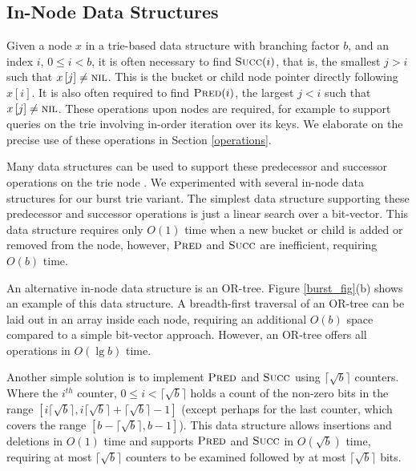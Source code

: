 \documentclass[]{acmtrans2m}
\begin{document}
\subsection{In-Node Data Structures}
\label{in_node_structs}

Given a node $x$ in a trie-based data structure with branching factor $b$, and an index $i$, 
$0 \leq i < b$, it is often necessary to find $\mbox{\textsc{Succ}}(i)$, that is, the smallest $j > i$ such that 
$x\left[j\right] \neq \mbox{\textsc{nil}}$. This is the bucket or child node pointer directly
following $x\left[i\right]$. It is also often required to find $\mbox{\textsc{Pred}}(i)$, 
the largest $j < i$ such that $x\left[j\right] \neq \mbox{\textsc{nil}}$. 
These operations upon nodes are required, for example to support queries on the trie involving
in-order iteration over its keys. We elaborate on the precise use of these operations in Section \ref{operations}.

Many data structures can be used to support these predecessor and successor operations on the trie node
\cite{Demaine03}. We experimented with several in-node data structures for our burst trie variant.
The simplest 
data structure supporting these predecessor and successor operations is
just a linear search over a bit-vector.
This data structure requires only $O(1)$ time when a new bucket or child is added or removed
from the node, however, $\mbox{\textsc{Pred}}$ and $\mbox{\textsc{Succ}}$ are inefficient, requiring 
$O(b)$ time. 

An alternative in-node data structure is an OR-tree. Figure \ref{burst_fig}(b) shows an
example of this data structure. A breadth-first traversal of an OR-tree can be laid out in an array inside each node, 
requiring an additional $O(b)$ space compared to a simple bit-vector approach. However, an OR-tree offers
all operations in $O(\lg b)$ time.

Another simple solution is to implement $\mbox{\textsc{Pred}}$ and $\mbox{\textsc{Succ}}$ 
using $\lceil\sqrt{b}\rceil$ counters. Where the $i^{th}$ counter, $0 \leq i < \lceil \sqrt{b} \rceil$ 
holds a count of the non-zero bits in the range 
$[i\lceil \sqrt{b} \rceil, i\lceil\sqrt{b}\rceil + \lceil\sqrt{b}\rceil - 1]$
(except perhaps for the last counter, which covers the range $[b - \lceil\sqrt{b}\rceil, b - 1]$).
This data structure allows insertions and deletions in $O(1)$ time and supports 
$\mbox{\textsc{Pred}}$ and $\mbox{\textsc{Succ}}$ in $O(\sqrt{b})$ time, requiring at most $\lceil\sqrt{b}\rceil$
counters to be examined followed by at most $\lceil\sqrt{b}\rceil$ bits.
\end{document}
